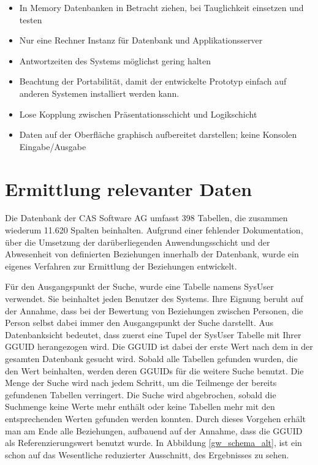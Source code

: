 \begin{itemize}

	\item In Memory Datenbanken in Betracht ziehen, bei Tauglichkeit einsetzen und testen
	
	\item Nur eine Rechner Instanz für Datenbank und Applikationsserver 
	
	\item Antwortzeiten des Systems möglichst gering halten
	
	\item Beachtung der Portabilität, damit der entwickelte Prototyp einfach auf anderen Systemen installiert werden kann.
	
	\item Lose Kopplung zwischen Präsentationsschicht und Logikschicht
	
	\item Daten auf der Oberfläche graphisch aufbereitet darstellen; keine Konsolen Eingabe/Ausgabe

\end{itemize}

\section{Ermittlung relevanter Daten}
\label{ch:Systemanalyse:sec:Information}

Die Datenbank der CAS Software AG umfasst 398 Tabellen, die zusammen wiederum 11.620 Spalten beinhalten. Aufgrund einer fehlender Dokumentation, über die Umsetzung der darüberliegenden Anwendungsschicht und der Abwesenheit von definierten Beziehungen innerhalb der Datenbank, wurde ein eigenes Verfahren zur Ermittlung der Beziehungen entwickelt. 

Für den Ausgangspunkt der Suche, wurde eine Tabelle namens SysUser verwendet. Sie beinhaltet jeden Benutzer des Systems. Ihre Eignung beruht auf der Annahme, dass bei der Bewertung von Beziehungen zwischen Personen, die Person selbst dabei immer den Ausgangspunkt der Suche darstellt. Aus Datenbanksicht bedeutet, dass zuerst eine Tupel der SysUser Tabelle mit Ihrer GGUID herangezogen wird. Die GGUID ist dabei der erste Wert nach dem in der gesamten Datenbank gesucht wird. Sobald alle Tabellen gefunden wurden, die den Wert beinhalten, werden deren GGUIDs für die weitere Suche benutzt. Die Menge der Suche wird nach jedem Schritt, um die Teilmenge der bereits gefundenen Tabellen verringert. Die Suche wird abgebrochen, sobald die Suchmenge keine Werte mehr enthält oder keine Tabellen mehr mit den entsprechenden Werten gefunden werden konnten. Durch dieses Vorgehen erhält man am Ende alle Beziehungen, aufbauend auf der Annahme, dass die GGUID als Referenzierungswert benutzt wurde. In Abbildung \ref{gw_schema_alt}, ist ein schon auf das Wesentliche reduzierter Ausschnitt, des Ergebnisses zu sehen. 

